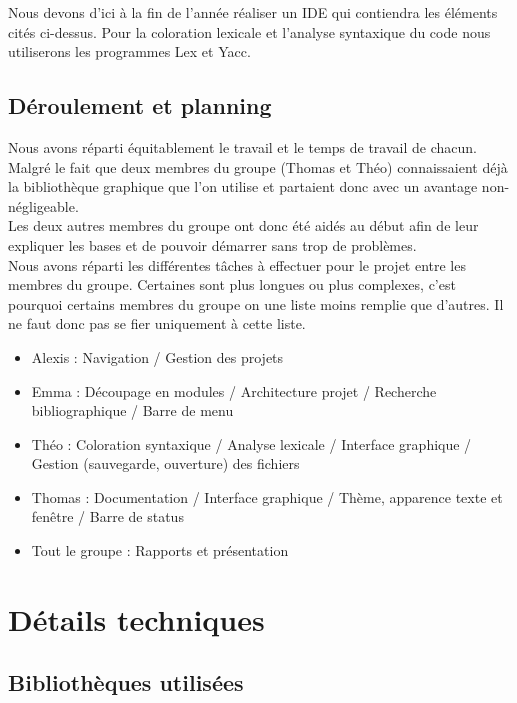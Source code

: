 \documentclass[a4paper,12pt]{article}
\begin{document}
	Nous devons d'ici à la fin de l'année réaliser un IDE qui contiendra les éléments cités ci-dessus. Pour la coloration lexicale et l'analyse syntaxique du code nous utiliserons les programmes Lex et Yacc.
	
	\subsection{Déroulement et planning}
	
	Nous avons réparti équitablement le travail et le temps de travail de chacun. Malgré le fait que deux membres du groupe (Thomas et Théo) connaissaient déjà la bibliothèque graphique que l'on utilise et partaient donc avec un avantage non-négligeable. \\
	Les deux autres membres du groupe ont donc été aidés au début afin de leur expliquer les bases et de pouvoir démarrer sans trop de problèmes.\\
	
	Nous avons réparti les différentes tâches à effectuer pour le projet entre les membres du groupe. Certaines sont plus longues ou plus complexes, c'est pourquoi certains membres du groupe on une liste moins remplie que d'autres. Il ne faut donc pas se fier uniquement à cette liste.\\
	
	\begin{itemize}
		\item Alexis : Navigation / Gestion des projets
		\item Emma : Découpage en modules / Architecture projet / Recherche bibliographique / Barre de menu
		\item Théo : Coloration syntaxique / Analyse lexicale / Interface graphique / Gestion (sauvegarde, ouverture) des fichiers
		\item Thomas : Documentation / Interface graphique / Thème, apparence texte et fenêtre / Barre de status
		\item Tout le groupe : Rapports et présentation 
	\end{itemize}
	
\section{Détails techniques}

	\subsection{Bibliothèques utilisées}
	
\end{document}
